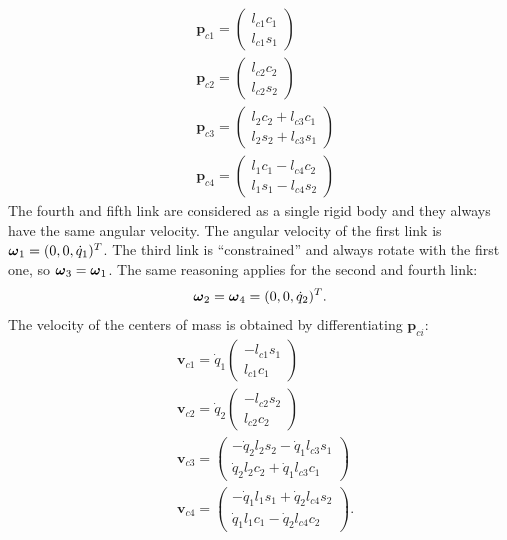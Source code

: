 \documentclass[10pt, a4paper]{report}
\begin{document}
\begin{align}
    &\mathbf p_{c1}=\begin{pmatrix}
        l_{c1}c_1\\ 
        l_{c1}s_1
    \end{pmatrix}\\ 
    &\mathbf p_{c2}=\begin{pmatrix}
        l_{c2}c_2\\ 
        l_{c2}s_2
    \end{pmatrix}\\ 
    &\mathbf p_{c3}=\begin{pmatrix}
        l_{2}c_2+l_{c3}c_1\\ 
        l_{2}s_2+l_{c3}s_1
    \end{pmatrix}\\ 
    &\mathbf p_{c4}=\begin{pmatrix}
        l_1c_1-l_{c4}c_2\\ 
        l_1s_1-l_{c4}s_2
    \end{pmatrix}
\end{align}
The fourth and fifth link are considered as a single rigid body and they always have the same angular velocity. The angular velocity of the first link is ${\boldsymbol{\omega}}_1=(0,0,\dot q_1)^T$. The third link is ``constrained'' and always rotate with the first one, so ${\boldsymbol{\omega}}_3={\boldsymbol{\omega}}_1$. The same reasoning applies for the second and fourth link:\begin{equation}
    {\boldsymbol{\omega}}_2={\boldsymbol{\omega}}_4=(0,0,\dot q_2)^T.
\end{equation}
The velocity of the centers of mass is obtained by differentiating $\mathbf p_{ci}$:
    \begin{align}
    &\mathbf v_{c1}=\dot q_1\begin{pmatrix}
        -l_{c1}s_1\\ 
        l_{c1}c_1
    \end{pmatrix}\\ 
    &\mathbf v_{c2}=\dot q_2\begin{pmatrix}
       - l_{c2}s_2\\ 
        l_{c2}c_2
    \end{pmatrix}\\ 
    &\mathbf v_{c3}=\begin{pmatrix}
        -\dot q_2l_{2}s_2-\dot q_1l_{c3}s_1\\ 
        \dot q_2l_{2}c_2+\dot q_1l_{c3}c_1
    \end{pmatrix}\\ 
    &\mathbf v_{c4}=\begin{pmatrix}
        -\dot q_1l_1s_1+\dot q_2l_{c4}s_2\\ 
        \dot q_1l_1c_1-\dot q_2l_{c4}c_2
    \end{pmatrix}.
\end{align}
\end{document}
